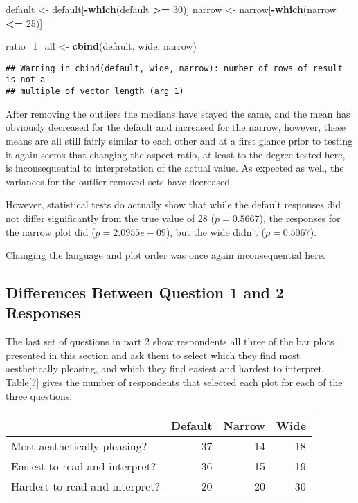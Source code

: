 \documentclass[
]{article}
\newenvironment{Shaded}{\begin{snugshade}}{\end{snugshade}}
\newcommand{\DecValTok}[1]{\textcolor[rgb]{0.00,0.00,0.81}{#1}}
\newcommand{\KeywordTok}[1]{\textcolor[rgb]{0.13,0.29,0.53}{\textbf{#1}}}
\newcommand{\NormalTok}[1]{#1}
\newcommand{\OperatorTok}[1]{\textcolor[rgb]{0.81,0.36,0.00}{\textbf{#1}}}
\newcommand{\StringTok}[1]{\textcolor[rgb]{0.31,0.60,0.02}{#1}}
\begin{document}
\begin{Shaded}
\begin{Highlighting}[]
\NormalTok{default <-}\StringTok{ }\NormalTok{default[}\OperatorTok{-}\KeywordTok{which}\NormalTok{(default }\OperatorTok{>=}\StringTok{ }\DecValTok{30}\NormalTok{)]}
\NormalTok{narrow <-}\StringTok{ }\NormalTok{narrow[}\OperatorTok{-}\KeywordTok{which}\NormalTok{(narrow }\OperatorTok{<=}\StringTok{ }\DecValTok{25}\NormalTok{)]}

\NormalTok{ratio_}\DecValTok{1}\NormalTok{_all <-}\StringTok{ }\KeywordTok{cbind}\NormalTok{(default, wide, narrow)}
\end{Highlighting}
\end{Shaded}

\begin{verbatim}
## Warning in cbind(default, wide, narrow): number of rows of result is not a
## multiple of vector length (arg 1)
\end{verbatim}

After removing the outliers the medians have stayed the same, and the
mean has obviously decreased for the default and increased for the
narrow, however, these means are all still fairly similar to each other
and at a first glance prior to testing it again seems that changing the
aspect ratio, at least to the degree tested here, is inconsequential to
interpretation of the actual value. As expected as well, the variances
for the outlier-removed sets have decreased.

However, statistical tests do actually show that while the default
responses did not differ significantly from the true value of 28
(\(p=0.5667\)), the responses for the narrow plot did
(\(p=2.0955e-09\)), but the wide didn't (\(p=0.5067\)).

Changing the language and plot order was once again inconsequential
here.

\subsection{Differences Between Question 1 and 2 Responses}

The last set of questions in part 2 show respondents all three of the
bar plots presented in this section and ask them to select which they
find most aesthetically pleasing, and which they find easiest and
hardest to interpret. Table{[}?{]} gives the number of respondents that
selected each plot for each of the three questions.

\begin{table}[!h]
\centering
\begin{tabular}{l|r|r|r}
\hline
  & Default & Narrow & Wide\\
\hline
Most aesthetically pleasing? & 37 & 14 & 18\\
\hline
Easiest to read and interpret? & 36 & 15 & 19\\
\hline
Hardest to read and interpret? & 20 & 20 & 30\\
\hline
\end{tabular}
\end{table}
\end{document}
